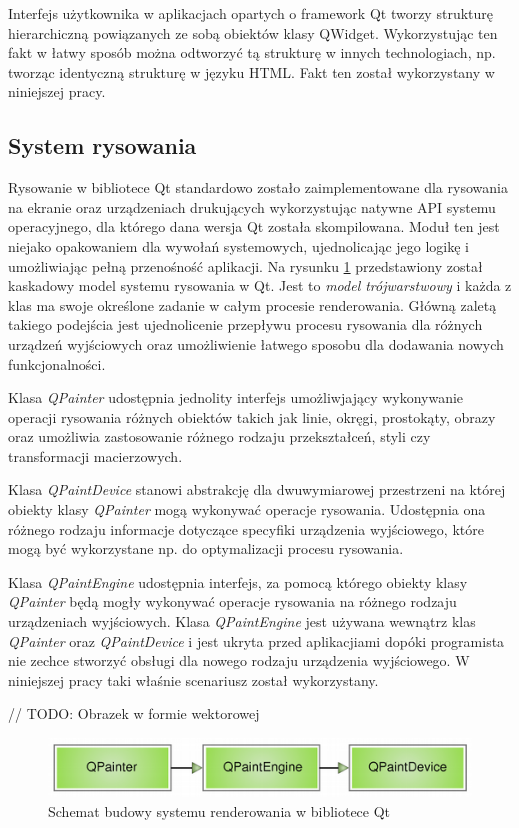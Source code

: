 Interfejs użytkownika w aplikacjach opartych o framework Qt tworzy strukturę hierarchiczną powiązanych ze sobą obiektów klasy QWidget. Wykorzystując ten fakt w łatwy sposób można odtworzyć tą strukturę w innych technologiach, np. tworząc identyczną strukturę w języku HTML. Fakt ten został wykorzystany w niniejszej pracy.

\subsection{System rysowania}
\label{system_rysowania}
Rysowanie w bibliotece Qt standardowo zostało zaimplementowane dla rysowania na ekranie oraz urządzeniach drukujących wykorzystując natywne API systemu operacyjnego, dla którego dana wersja Qt została skompilowana. Moduł ten jest niejako opakowaniem dla wywołań systemowych, ujednolicając jego logikę i umożliwiając pełną przenośność aplikacji. Na rysunku \ref{paintsystem-core} przedstawiony został kaskadowy model systemu rysowania w Qt. Jest to \emph{model trójwarstwowy} i każda z klas ma swoje określone zadanie w całym procesie renderowania. Główną zaletą takiego podejścia jest ujednolicenie przepływu procesu rysowania dla różnych urządzeń wyjściowych oraz umożliwienie łatwego sposobu dla dodawania nowych funkcjonalności.

Klasa \emph{QPainter} udostępnia jednolity interfejs umożliwjający wykonywanie operacji rysowania różnych obiektów takich jak linie, okręgi, prostokąty, obrazy oraz umożliwia zastosowanie różnego rodzaju przekształceń, styli czy transformacji macierzowych. 

Klasa \emph{QPaintDevice} stanowi abstrakcję dla dwuwymiarowej przestrzeni na której obiekty klasy \emph{QPainter} mogą wykonywać operacje rysowania. Udostępnia ona różnego rodzaju informacje dotyczące specyfiki urządzenia wyjściowego, które mogą być wykorzystane np. do optymalizacji procesu rysowania. 

Klasa \emph{QPaintEngine} udostępnia interfejs, za pomocą którego obiekty klasy \emph{QPainter} będą mogły wykonywać operacje rysowania na różnego rodzaju urządzeniach wyjściowych. Klasa \emph{QPaintEngine} jest używana wewnątrz klas \emph{QPainter} oraz \emph{QPaintDevice} i jest ukryta przed aplikacjiami dopóki programista nie zechce stworzyć obsługi dla nowego rodzaju urządzenia wyjściowego. W niniejszej pracy taki właśnie scenariusz został wykorzystany.
 
// TODO: Obrazek w formie wektorowej

\begin{figure}[!h]
  \centering
  \includegraphics[width=\textwidth,height=!]{img/paintsystem-core.png}
  \caption{Schemat budowy systemu renderowania w bibliotece Qt}
  \label{paintsystem-core}
\end{figure}